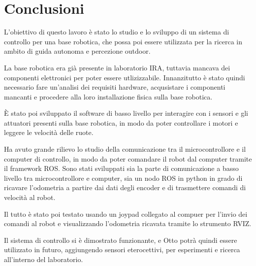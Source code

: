 \chapter{Conclusioni}

L’obiettivo di questo lavoro è stato lo studio e lo sviluppo di un sistema di controllo per una base robotica, che possa poi essere utilizzata per la ricerca in ambito di guida autonoma e percezione outdoor.

La base robotica era già presente in laboratorio IRA, tuttavia mancava dei componenti elettronici per poter essere utlizizzabile.
Innanzitutto è stato quindi necessario fare un'analisi dei requisiti hardware, acqusistare i componenti mancanti e procedere alla loro installazione fisica sulla base robotica.

È stato poi sviluppato il software di basso livello per interagire con i sensori e gli attuatori presenti sulla base robotica, in modo da poter controllare i motori e leggere le velocità delle ruote.

Ha avuto grande rilievo lo studio della comunicazione tra il microcontrollore e il computer di controllo, in modo da poter comandare il robot dal computer tramite il framework ROS. Sono stati sviluppati sia la parte di comunicazione a basso livello tra microcontrollore e computer, sia un nodo ROS in python in grado di ricavare l'odometria a partire dai dati degli encoder e di trasmettere comandi di velocità al robot.

Il tutto è stato poi testato usando un joypad collegato al compuer per l'invio dei comandi al robot e visualizzando l'odometria ricavata tramite lo strumento RVIZ. 

Il sistema di controllo si è dimostrato funzionante, e Otto potrà quindi essere utilizzato in futuro, aggiungendo sensori eterocettivi, per esperimenti e ricerca all'interno del laboratorio.


